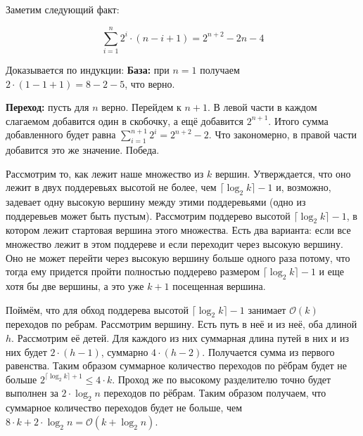 \section{}
	Заметим следующий факт:
	
	\begin{equation}
		\sum_{i = 1}^{n} 2^i \cdot (n - i + 1) = 2^{n + 2} - 2n - 4
	\end{equation}
	
	Доказывается по индукции:
	\textbf{База:} при $n = 1$ получаем $2 \cdot (1 - 1 + 1) = 8 - 2 - 5$, что верно.
	
	\textbf{Переход:} пусть для $n$ верно. Перейдем к $n+1$. В левой части в каждом слагаемом добавится один в скобочку, а ещё добавится $2 ^ {n + 1}$. Итого сумма добавленного будет равна $\sum_{i = 1}^{n+1} 2^i = 2^{n + 2} - 2$. Что закономерно, в правой части добавится это же значение. Победа.

	Рассмотрим то, как лежит наше множество из $k$ вершин. Утверждается, что оно лежит в двух поддеревьях высотой не более, чем $\lceil\log_2k\rceil - 1$ и, возможно, задевает одну высокую вершину между этими поддеревьями (одно из поддеревьев может быть пустым). Рассмотрим поддерево высотой $\lceil\log_2k\rceil - 1$, в котором лежит стартовая вершина этого множества. Есть два варианта: если все множество лежит в этом поддереве и если переходит через высокую вершину. Оно не может перейти через высокую вершину больше одного раза потому, что тогда ему придется пройти полностью поддерево размером $\lceil\log_2k\rceil - 1$ и еще хотя бы две вершины, а это уже $k + 1$ посещенная вершина. 
	
	Поймём, что для обход поддерева высотой $\lceil\log_2k\rceil - 1$ занимает $\mathcal{O}(k)$ переходов по ребрам. Рассмотрим вершину. Есть путь в неё и из неё, оба длиной $h$. Рассмотрим её детей. Для каждого из них суммарная длина путей в них и из них будет $2\cdot (h - 1)$, суммарно $4\cdot (h - 2)$. Получается сумма из первого равенства. Таким образом суммарное количество переходов по рёбрам будет не больше $2^{\lceil\log_2k\rceil + 1} \leq 4 \cdot k$. Проход же по высокому разделителю точно будет выполнен за $2 \cdot \log_2n$ переходов по рёбрам. Таким образом получаем, что суммарное количество переходов будет не больше, чем $8\cdot k + 2 \cdot \log_2n = \mathcal{O}(k + \log_2n)$.
	